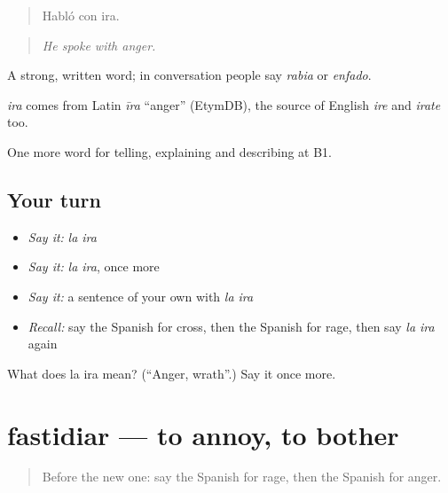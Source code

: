 \begin{quote}
Habló con ira.
\end{quote}

\begin{quote}
\emph{He spoke with anger.}
\end{quote}

A strong, written word; in conversation people say \emph{rabia} or \emph{enfado}.

\begin{cousinweb}
\emph{ira} comes from Latin \emph{īra} \textquotedblleft{}anger\textquotedblright{} (EtymDB), the source of English \emph{ire} and \emph{irate} too.
\end{cousinweb}

\begin{grammarlens}[title={What you've built}]
One more word for telling, explaining and describing at B1.
\end{grammarlens}

\subsection*{Your turn}
\begin{itemize}
\raggedright
  \item \emph{Say it:} \emph{la ira}
  \item \emph{Say it:} \emph{la ira}, once more
  \item \emph{Say it:} a sentence of your own with \emph{la ira}
  \item \emph{Recall:} say the Spanish for cross, then the Spanish for rage, then say \emph{la ira} again
\end{itemize}

\begin{tcolorbox}[breakable,colback=teal!4,colframe=teal!35!black,title={Before you move on}]
What does la ira mean? (\textquotedblleft{}Anger, wrath\textquotedblright{}.) Say it once more.
\end{tcolorbox}
\section[fastidiar]{fastidiar — to annoy, to bother}

\label{lesson:ES-C707-fastidiar}



\begin{quote}
Before the new one: say the Spanish for rage, then the Spanish for anger.
\end{quote}


